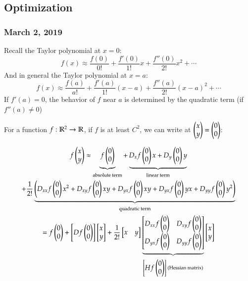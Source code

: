 \subsection{Optimization}
\subsubsection*{March 2, 2019}

Recall the Taylor polynomial at $x=0$: 
\[f(x)\approx \frac{f(0)}{0!} + \frac{f'(0)}{1!}x + \frac{f''(0)}{2!}x^2+\cdots\]
And in general the Taylor polynomial at $x=a$: 
\[f(x)\approx \frac{f(a)}{a!} + \frac{f'(a)}{1!}(x-a) + \frac{f''(a)}{2!}(x-a)^2+\cdots\]
If $f'(a)=0$, the behavior of $f$ near $a$ is determined by the quadratic term (if $f''(a)\neq 0$)

For a function $f : \mathbb{R}^2 \to \mathbb{R}$, if $f$ is at least $C^2$, we can write at $\begin{pmatrix} x \\ y \end{pmatrix} = \begin{pmatrix} 0 \\ 0 \end{pmatrix}$: 

\begin{multline}
	f\begin{pmatrix} x \\ y \end{pmatrix} \approx \underbrace{f\begin{pmatrix} 0 \\ 0 \end{pmatrix}}_{\text{absolute term}} + \underbrace{D_xf\begin{pmatrix} 0 \\ 0 \end{pmatrix}x + D_y\begin{pmatrix} 0 \\ 0 \end{pmatrix}y}_{\text{linear term}} \\ 
	+ \frac{1}{2!}\underbrace{\left(D_{xx}f\begin{pmatrix} 0 \\ 0 \end{pmatrix}x^2 + D_{xy}f\begin{pmatrix} 0 \\ 0 \end{pmatrix}xy + D_{yx}f\begin{pmatrix} 0 \\ 0 \end{pmatrix} xy + D_{yx}f\begin{pmatrix} 0 \\ 0 \end{pmatrix}yx + D_{yy}f\begin{pmatrix} 0 \\ 0 \end{pmatrix}y^2\right)}_{\text{quadratic term}} \\
	=f\begin{pmatrix} 0 \\ 0 \end{pmatrix} + \begin{bmatrix} Df\begin{pmatrix} 0 \\ 0 \end{pmatrix} \end{bmatrix}\begin{bmatrix} x \\ y \end{bmatrix} + \frac{1}{2!}\begin{bmatrix} x & y \end{bmatrix}\underbrace{\begin{bmatrix} D_{xx}f\begin{pmatrix} 0 \\ 0 \end{pmatrix} & D_{xy}f\begin{pmatrix} 0 \\ 0 \end{pmatrix} \\ D_{yx}f\begin{pmatrix} 0 \\ 0 \end{pmatrix} & D_{yy}f\begin{pmatrix} 0 \\ 0 \end{pmatrix} \end{bmatrix}}_{\begin{bmatrix} Hf\begin{pmatrix} 0 \\ 0 \end{pmatrix} \end{bmatrix}\text{ (Hessian matrix)}}\begin{bmatrix} x \\ y \end{bmatrix}
\end{multline}

